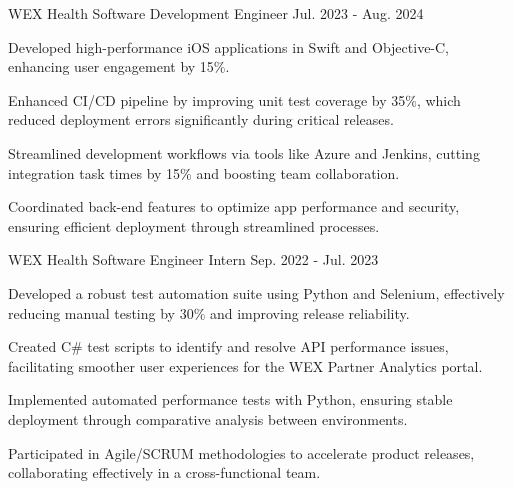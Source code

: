 


\begin{cventries}

  \cventry
    {WEX Health} %
    {Software Development Engineer} %
    {} %
    {Jul. 2023 - Aug. 2024} %
    {
      \begin{cvitems} %
      \item {Developed high-performance iOS applications in Swift and Objective-C, enhancing user engagement by 15\%.}
    \item {Enhanced CI/CD pipeline by improving unit test coverage by 35\%, which reduced deployment errors significantly during critical releases.}
    \item {Streamlined development workflows via tools like Azure and Jenkins, cutting integration task times by 15\% and boosting team collaboration.}
    \item {Coordinated back-end features to optimize app performance and security, ensuring efficient deployment through streamlined processes.}
      \end{cvitems}
    }

  \cventry
    {WEX Health} %
    {Software Engineer Intern} %
    {} %
    {Sep. 2022 - Jul. 2023} %
    {
      \begin{cvitems} %
      \item {Developed a robust test automation suite using Python and Selenium, effectively reducing manual testing by 30\% and improving release reliability.}
    \item {Created C\# test scripts to identify and resolve API performance issues, facilitating smoother user experiences for the WEX Partner Analytics portal.}
    \item {Implemented automated performance tests with Python, ensuring stable deployment through comparative analysis between environments.}
    \item {Participated in Agile/SCRUM methodologies to accelerate product releases, collaborating effectively in a cross-functional team.}
      \end{cvitems}
    }


\end{cventries}
